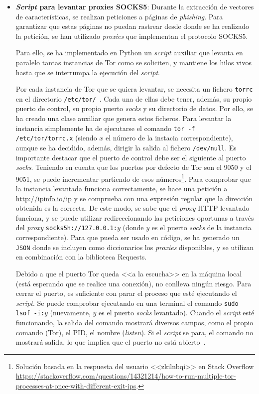 \begin{itemize}
	\item \textbf{\textit{Script} para levantar proxies SOCKS5}:
	\label{sec:script_tor}
Durante la extracción de vectores de características, se realizan peticiones a páginas de \textit{phishing}. Para garantizar que estas páginas no puedan rastrear desde donde se ha realizado la petición, se han utilizado \textit{proxies} que implementan el protocolo SOCKS5.

Para ello, se ha implementado en Python un \textit{script} auxiliar que levanta en paralelo tantas instancias de Tor como se soliciten, y mantiene los hilos vivos hasta que se interrumpa la ejecución del \textit{script}.

Por cada instancia de Tor que se quiera levantar, se necesita un fichero \texttt{torrc} en el directorio \texttt{/etc/tor/}~\cite{TorFicherosTor}. Cada una de ellas debe tener, además, su propio puerto de control, su propio puerto \textit{socks} y su directorio de datos. Por ello, se ha creado una clase auxiliar que genera estos ficheros. Para levantar la instancia simplemente ha de ejecutarse el comando \texttt{tor -f /etc/tor/torrc.x} (siendo $x$ el número de la instacia correspondiente), aunque se ha decidido, además, dirigir la salida al fichero \texttt{/dev/null}. Es importante destacar que el puerto de control debe ser el siguiente al puerto \textit{socks}. Teniendo en cuenta que los puertos por defecto de Tor son el 9050 y el 9051, se puede incrementar partiendo de esos números\footnote{Solución basada en la respuesta del usuario <<zkilnbqi>> en Stack Overflow \url{https://stackoverflow.com/questions/14321214/how-to-run-multiple-tor-processes-at-once-with-different-exit-ips}.}. Para comprobar que la instancia levantada funciona correctamente, se hace una petición a \url{http://ipinfo.io/ip} y se comprueba con una expresión regular que la dirección obtenida es la correcta. De este modo, se sabe que el \textit{proxy} HTTP levantado funciona, y se puede utilizar redireccionando las peticiones oportunas a través del \textit{proxy} \texttt{socks5h://127.0.0.1:$y$} (donde $y$ es el puerto \textit{socks} de la instancia correspondiente). Para que pueda ser usado en código, se ha generado un \texttt{JSON} donde se incluyen como diccionarios los \textit{proxies} disponibles, y se utilizan en combinación con la biblioteca Requests.

Debido a que el puerto Tor queda <<a la escucha>> en la máquina local (está esperando que se realice una conexión), no conlleva ningún riesgo. Para cerrar el puerto, es suficiente con parar el proceso que esté ejecutando el \textit{script}. Se puede comprobar ejecutando en una terminal el comando \texttt{sudo lsof -i:$y$} (nuevamente, $y$ es el puerto \textit{socks} levantado). Cuando el \textit{script} esté funcionando, la salida del comando mostrará diversos campos, como el propio comando (Tor), el PID, el nombre (\textit{listen}). Si el \textit{script} se para, el comando no mostrará salida, lo que implica que el puerto no está abierto~\cite{checkOpenTorPorts}.


\end{itemize}
